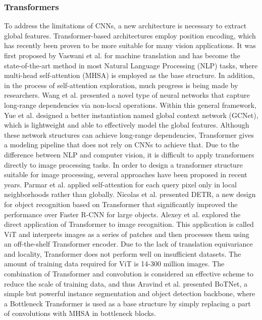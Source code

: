 \documentclass[journal]{IEEEtran}
\begin{document}
\subsubsection{Transformers}
To address the limitations of CNNs, a new architecture is necessary to extract global features. Transformer-based architectures employ position encoding, which has recently been proven to be more suitable for many vision applications\cite{han2020survey}.
It was first proposed by Vaswani et al.\cite{vaswani2017attention} for machine translation and has become the state-of-the-art method in most Natural Language Processing (NLP) tasks, where multi-head self-attention (MHSA) is employed as the base structure. In addition, in the process of self-attention exploration, much progress is being made by researchers. Wang et al.\cite{wang2018non} presented a novel type of neural networks that capture long-range dependencies via non-local operations. Within this general framework, Yue et al.\cite{cao2019gcnet} designed a better instantiation named global context network (GCNet), which is lightweight and able to effectively model the global features. Although these network structures can achieve long-range dependencies, Transformer gives a modeling pipeline that does not rely on CNNs to achieve that. Due to the difference between NLP and computer vision, it is difficult to apply transformers directly to image processing tasks. In order to design a transformer structure suitable for image processing, several approaches have been proposed in recent years. Parmar et al.\cite{parmar2018image} applied self-attention for each query pixel only in local neighborhoods rather than globally. Nicolas et al.\cite{carion2020end} presented DETR, a new design for object recognition based on Transformer that significantly improved the performance over Faster R-CNN for large objects. Alexey et al.\cite{dosovitskiy2020image} explored the direct application of Transformer to image recognition. This application is called ViT and interprets images as a series of patches and then processes them using an off-the-shelf Transformer encoder. Due to the lack of translation equivariance and locality, Transformer does not perform well on insufficient datasets. The amount of training data required for ViT is 14-300 million images. The combination of Transformer and convolution is considered an effective scheme to reduce the scale of training data, and thus Aravind et al.\cite{srinivas2021bottleneck} presented BoTNet, a simple but powerful instance segmentation and object detection backbone, where a Bottleneck Transformer is used as a base structure by simply replacing a part of convolutions with MHSA in bottleneck blocks. 
\end{document}
